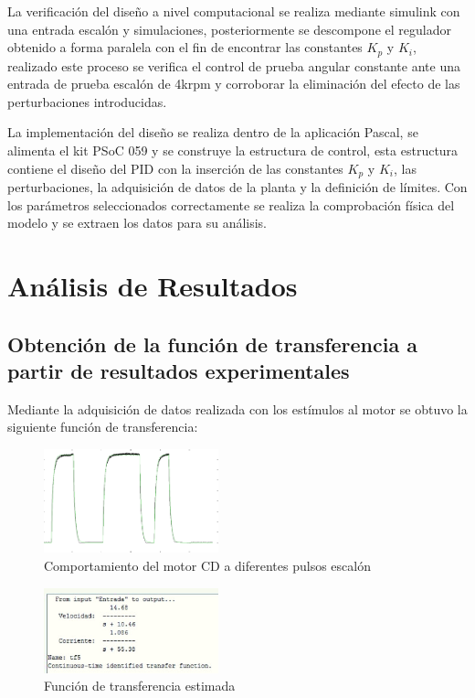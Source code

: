 \documentclass[conference]{IEEEtran}
\begin{document}
La verificación del diseño a nivel computacional se realiza mediante simulink con una entrada escalón y simulaciones, posteriormente se descompone el regulador obtenido a forma paralela con el fin de encontrar las constantes $K_p$ y $K_i$, realizado este proceso se verifica el control de prueba angular constante ante una entrada de prueba escalón de 4krpm y corroborar la eliminación del efecto de las perturbaciones introducidas.

La implementación del diseño se realiza dentro de la aplicación Pascal, se alimenta el kit PSoC 059 y se construye la estructura de control, esta estructura contiene el diseño del PID con la inserción de las constantes $K_p$ y $K_i$, las perturbaciones, la adquisición de datos de la planta y la definición de límites. Con los parámetros seleccionados correctamente se realiza la comprobación física del modelo y se extraen los datos para su análisis.

\section{Análisis de Resultados}
\subsection{Obtención de la función de transferencia a partir de resultados experimentales}
Mediante la adquisición de datos realizada con los estímulos al motor se obtuvo la siguiente función de transferencia:
\begin{figure}[!h]
\centering
\includegraphics[width=0.45\textwidth]{images/Img03.png}
\caption{Comportamiento del motor CD a diferentes pulsos escalón}
\label{fig:comp_cd}
\end{figure}

\begin{figure}[!h]
\centering
\includegraphics[width=0.45\textwidth]{images/img02.jpeg}
\caption{Función de transferencia estimada}
\label{fig:tf_estimated}
\end{figure}
\end{document}
